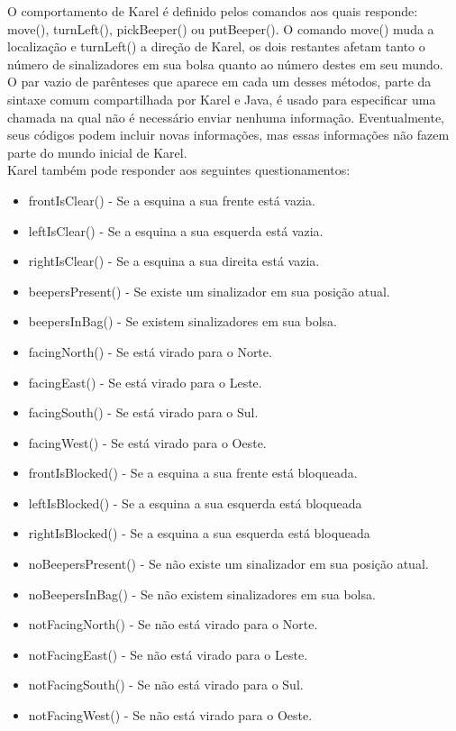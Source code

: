 \documentclass[a4paper,11pt]{article}
\begin{document}
O comportamento de Karel é definido pelos comandos aos quais responde: move(), turnLeft(), pickBeeper() ou putBeeper(). O comando move() muda a localização e turnLeft() a direção de Karel, os dois restantes afetam tanto o número de sinalizadores em sua bolsa quanto ao número destes em seu mundo. \\[3mm]
O par vazio de parênteses que aparece em cada um desses métodos, parte da sintaxe comum compartilhada por Karel e Java, é usado para especificar uma chamada na qual não é necessário enviar nenhuma informação. Eventualmente, seus códigos podem incluir novas informações, mas essas informações não fazem parte do mundo inicial de Karel. \\[3mm]
Karel também pode responder aos seguintes questionamentos: \vspace{-1em}
\begin{itemize}
 \item frontIsClear() - Se a esquina a sua frente está vazia.
 \item leftIsClear() - Se a esquina a sua esquerda está vazia.
 \item rightIsClear() - Se a esquina a sua direita está vazia.
 \item beepersPresent() - Se existe um sinalizador em sua posição atual.
 \item beepersInBag() - Se existem sinalizadores em sua bolsa.
 \item facingNorth() - Se está virado para o Norte.
 \item facingEast() - Se está virado para o Leste.
 \item facingSouth() - Se está virado para o Sul.
 \item facingWest() - Se está virado para o Oeste.
 \item frontIsBlocked() - Se a esquina a sua frente está bloqueada.
 \item leftIsBlocked() - Se a esquina a sua esquerda está bloqueada
 \item rightIsBlocked() - Se a esquina a sua esquerda está bloqueada
 \item noBeepersPresent() - Se não existe um sinalizador em sua posição atual.
 \item noBeepersInBag() - Se não existem sinalizadores em sua bolsa.
 \item notFacingNorth() - Se não está virado para o Norte.
 \item notFacingEast() - Se não está virado para o Leste.
 \item notFacingSouth() - Se não está virado para o Sul.
 \item notFacingWest() - Se não está virado para o Oeste.
\end{itemize} 
\end{document}
